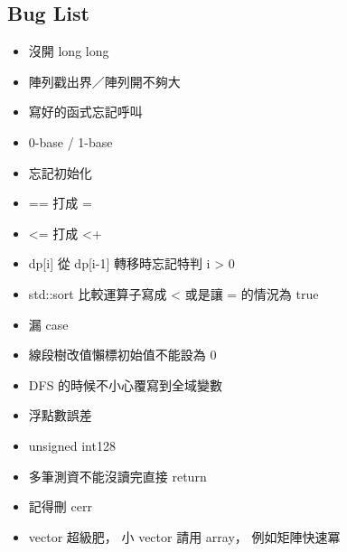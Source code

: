 \documentclass[a4paper,10pt,twocolumn,oneside]{article}
\begin{document}
\subsection{Bug List}
\begin{itemize}[nolistsep]
\item 沒開 long long
\item 陣列戳出界／陣列開不夠大
\item 寫好的函式忘記呼叫
\item 0-base / 1-base
\item 忘記初始化
\item == 打成 =
\item <= 打成 <+
\item dp[i] 從 dp[i-1] 轉移時忘記特判 i > 0
\item std::sort 比較運算子寫成 < 或是讓 = 的情況為 true
\item 漏 case
\item 線段樹改值懶標初始值不能設為 0
\item DFS 的時候不小心覆寫到全域變數
\item 浮點數誤差
\item unsigned int128
\item 多筆測資不能沒讀完直接 return
\item 記得刪 cerr
\item vector 超級肥， 小 vector 請用 array， 例如矩陣快速冪
\end{itemize}


\newpage

\end{document}

